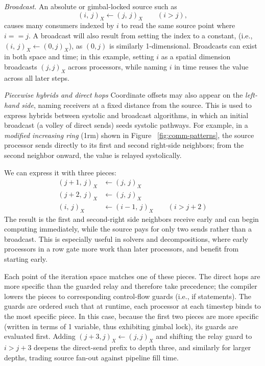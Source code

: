 \documentclass[sigplan, nonacm]{acmart}
\begin{document}
\emph{Broadcast.} An absolute or gimbal-locked source such as
%
\begin{equation}
  (i,\,j)_{X} \leftarrow (j,\,j)_{X} \qquad (i > j),
\end{equation}
%
causes many consumers indexed by \(i\) to read the same source point where $i==j$. A broadcast will also result from setting the index to a constant, (i.e., $  (i,\,j)_{X} \leftarrow (0,j)_X$), as $(0,j)$ is similarly 1-dimensional. Broadcasts can exist in both space and time; in this example, setting $i$ as a spatial dimension broadcasts $(j,j)_X$ across processors, while naming $i$ in time reuses the value across all later steps.  

\emph{Piecewise hybrids and direct hops} 
Coordinate offsets
may also appear on the \emph{left-hand side}, naming receivers at a fixed
distance from the source. This is used to express hybrids between systolic and broadcast algorithms, in which an initial broadcast (a volley of direct sends) seeds systolic pathways. For example, 
in a \emph{modified increasing
ring} (1rm) shown in Figure ~\ref{fig:comm-patterns}, the source processor sends directly to its first and second right-side neighbors; from the second
neighbor onward, the value is relayed systolically.

We can express it with three pieces:
%
\begin{align}
  (j{+}1,\,j)_{X} &\leftarrow (j,\,j)_{X} \\
  (j{+}2,\,j)_{X} &\leftarrow (j,\,j)_{X} \\
  (i,\,j)_{X} &\leftarrow (i{-}1,\,j)_{X} \qquad (i > j{+}2)
\end{align}
%
The result is the first and second-right side neighbors receive
early and can begin computing immediately, while the source pays for
only two sends rather than a broadcast. This is especially useful in solvers and decompositions, where early processors in a row gate more work than later processors, and benefit from starting early.


Each point of the iteration space matches one of these pieces. The direct hops are more specific than the guarded relay and therefore take precedence; the compiler lowers the pieces to corresponding control-flow guards (i.e., if statements). The guards are ordered such that at runtime, each processor at each timestep binds to the most specific piece. In this case, because the first two pieces are more specific (written in terms of 1 variable, thus exhibiting gimbal lock), its guards are evaluated first. Adding \((j+3,j)_X \leftarrow (j,j)_X\) and shifting the relay guard to \(i>j+3\) deepens the direct-send prefix to depth three, and similarly for larger depths, trading source fan-out against pipeline fill time.
\end{document}
